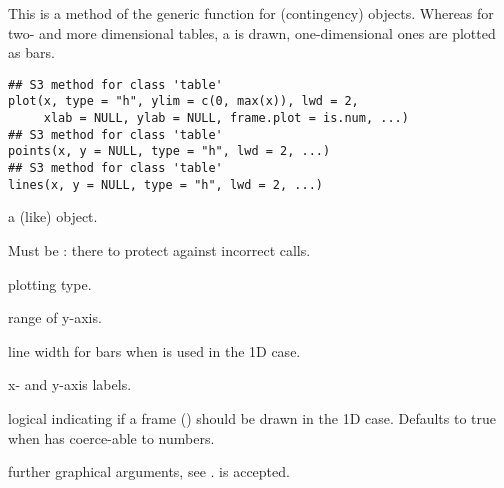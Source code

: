 %
\begin{Examples}
\end{Examples}
%
\begin{Description}\relax
This is a method of the generic  function for
(contingency)  objects.  Whereas for two- and more
dimensional tables, a  is drawn,
one-dimensional ones are plotted as bars.
\end{Description}
%
\begin{Usage}
\begin{verbatim}
## S3 method for class 'table'
plot(x, type = "h", ylim = c(0, max(x)), lwd = 2,
     xlab = NULL, ylab = NULL, frame.plot = is.num, ...)
## S3 method for class 'table'
points(x, y = NULL, type = "h", lwd = 2, ...)
## S3 method for class 'table'
lines(x, y = NULL, type = "h", lwd = 2, ...)
\end{verbatim}
\end{Usage}
%
\begin{Arguments}
\begin{ldescription}
\item[\code{x}] a  (like) object.
\item[\code{y}] Must be : there to protect against incorrect calls.
\item[\code{type}] plotting type.
\item[\code{ylim}] range of y-axis.
\item[\code{lwd}] line width for bars when  is used in the 1D case.
\item[\code{xlab, ylab}] x- and y-axis labels.
\item[\code{frame.plot}] logical indicating if a frame ()
should be drawn in the 1D case.  Defaults to true when  has
 coerce-able to numbers.
\item[\code{...}] further graphical arguments, see .
 is accepted.
\end{ldescription}
\end{Arguments}
